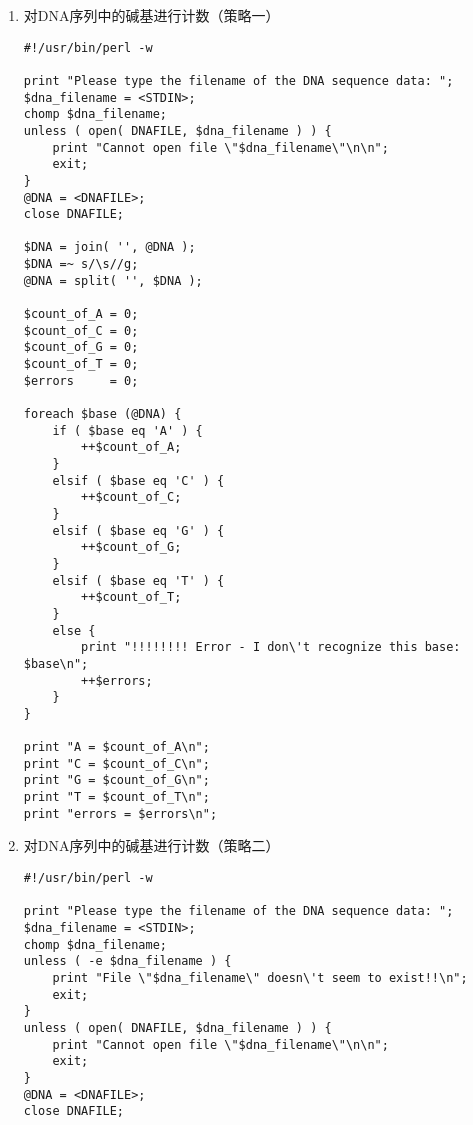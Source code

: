 \documentclass{TIJMUjiaoanSY}
\begin{document}
\begin{enumerate}
\begin{enumerate}
\begin{verbatim}
$proteinfilename = <STDIN>;
chomp $proteinfilename;
unless ( open( PROTEINFILE, $proteinfilename ) ) {
    print "Cannot open file \"$proteinfilename\"\n\n";
    exit;
}
@protein = <PROTEINFILE>;
close PROTEINFILE;

$protein = join( '', @protein );
$protein =~ s/\s//g;
do {
    print "Enter a motif to search for: ";
    $motif = <STDIN>;
    chomp $motif;
    if ( $protein =~ /$motif/ ) {
        print "I found it!\n\n";
    }
    else {
        print "I couldn\'t find it.\n\n";
    }
} until ( $motif =~ /^\s*$/ );
\end{verbatim}

\otherTail
\newpage
\otherHeader

      \item 对DNA序列中的碱基进行计数（策略一）
\begin{verbatim}
#!/usr/bin/perl -w

print "Please type the filename of the DNA sequence data: ";
$dna_filename = <STDIN>;
chomp $dna_filename;
unless ( open( DNAFILE, $dna_filename ) ) {
    print "Cannot open file \"$dna_filename\"\n\n";
    exit;
}
@DNA = <DNAFILE>;
close DNAFILE;

$DNA = join( '', @DNA );
$DNA =~ s/\s//g;
@DNA = split( '', $DNA );

$count_of_A = 0;
$count_of_C = 0;
$count_of_G = 0;
$count_of_T = 0;
$errors     = 0;

foreach $base (@DNA) {
    if ( $base eq 'A' ) {
        ++$count_of_A;
    }
    elsif ( $base eq 'C' ) {
        ++$count_of_C;
    }
    elsif ( $base eq 'G' ) {
        ++$count_of_G;
    }
    elsif ( $base eq 'T' ) {
        ++$count_of_T;
    }
    else {
        print "!!!!!!!! Error - I don\'t recognize this base: $base\n";
        ++$errors;
    }
}

print "A = $count_of_A\n";
print "C = $count_of_C\n";
print "G = $count_of_G\n";
print "T = $count_of_T\n";
print "errors = $errors\n";
\end{verbatim}

\otherTail
\newpage
\otherHeader

      \item 对DNA序列中的碱基进行计数（策略二）
\begin{verbatim}
#!/usr/bin/perl -w

print "Please type the filename of the DNA sequence data: ";
$dna_filename = <STDIN>;
chomp $dna_filename;
unless ( -e $dna_filename ) {
    print "File \"$dna_filename\" doesn\'t seem to exist!!\n";
    exit;
}
unless ( open( DNAFILE, $dna_filename ) ) {
    print "Cannot open file \"$dna_filename\"\n\n";
    exit;
}
@DNA = <DNAFILE>;
close DNAFILE;


\end{verbatim}
\end{enumerate}
\end{enumerate}
\end{document}
